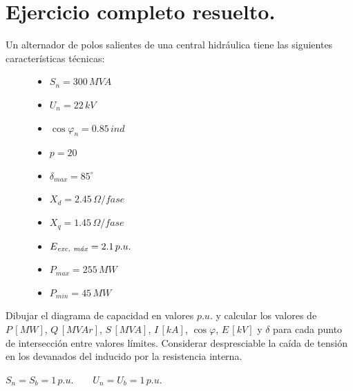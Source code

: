 		
	\section{Ejercicio completo resuelto.}		
		Un alternador de polos salientes de una central hidráulica tiene las siguientes características técnicas:
		\begin{figure}[H]
			\begin{minipage}{0.33\textwidth}
				\begin{itemize}
					\item $S_n = 300\,MV\!A$
					\item $U_n = 22\,kV$
					\item $\cos \varphi_n = 0.85\,ind$
					\item $p = 20$
				\end{itemize}
			\end{minipage}
			\begin{minipage}{0.33\textwidth}
				\begin{itemize}
					\item $\delta_{max} = 85^\circ$
					\item $X_d = 2.45\,\varOmega/fase$
					\item $X_q = 1.45\,\varOmega/fase$
				\end{itemize}
			\end{minipage}
			\begin{minipage}{0.33\textwidth}
				\begin{itemize}
					\item $E_{\text{\textit{exc, máx}}} = 2.1\,p.u.$
					\item $P_{max} = 255\,MW$
					\item $P_{min} = 45\,MW$
				\end{itemize}
			\end{minipage}
		\end{figure}
		

		Dibujar el diagrama de capacidad en valores $p.u.$ y calcular los valores de $P\,[MW]$, $Q\,[MV\!Ar]$, $S\,[MV\!A]$, $I\,[kA]$, $\cos \varphi$, $E\,[kV]$ y $\delta$ para cada punto de intersección entre valores límites. Considerar despresciable la caída de tensión en los devanados del inducido por la resistencia 
		interna.
		
		
		\noindent\makebox[\linewidth]{\rule{\paperwidth}{0.4pt}}
		\vspace{-0.2cm}
		
		
		$S_n = S_b = 1\,p.u.\qquad U_n = U_b = 1\,p.u.$
		
